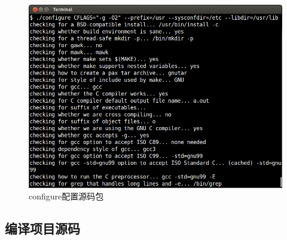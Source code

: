 \begin{figure}[htbp]
\centering
\includegraphics{./pictures/1-3-configure.png}
\caption{configure配置源码包}
\end{figure}

\subsection{编译项目源码}

